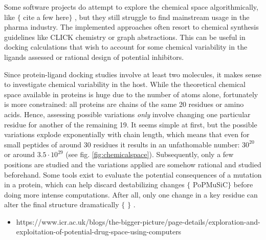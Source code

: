 Some software projects do attempt to explore the chemical space algorithmically, like $ \{ $ cite a few here$ \} $ , but they still struggle to find mainstream usage in the pharma industry. The implemented approaches often resort to chemical synthesis guidelines like CLICK chemistry\cite{durrant2009} or graph abstractions.\cite{andersen2014} This can be useful in docking calculations that wish to account for some chemical variability in the ligands assessed or rational design of potential inhibitors.

Since protein-ligand docking studies involve at least two molecules, it makes sense to investigate chemical variability in the host. While the theoretical chemical space available in proteins is huge due to the number of atoms alone, fortunately is more constrained: all proteins are chains of the same 20 residues or amino acids. Hence, assessing possible variations \textit{only} involve changing one particular residue for another of the remaining 19. It seems simple at first, but the possible variations explode exponentially with chain length, which means that even for small peptides of around 30 residues it results in an unfathomable number: $ 30^{20} $ or around $ 3.5·10^{29} $ (see fig. \ref{fig:chemicalspace}). Subsequently, only a few positions are studied and the variations applied are somehow rational and studied beforehand. Some tools exist to evaluate the potential consequences of a mutation in a protein, which can help discard destabilizing changes $ \{ $ PoPMuSiC$ \} $  before doing more intense computations. After all, only one change in a key residue can alter the final structure dramatically $ \{ $ $ \} $ .

\begin{itemize}
	\item https://www.icr.ac.uk/blogs/the-bigger-picture/page-details/exploration-and-exploitation-of-potential-drug-space-using-computers
\end{itemize}

